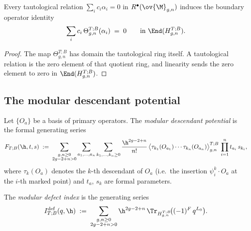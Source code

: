 \begin{proposition}
\label{prop:tautological-boundary-relations}
Every tautological relation $\sum_i c_i \alpha_i = 0$ in $R^\bullet(\ov{\M}_{g,n})$
induces the boundary operator identity
\[
\sum_i c_i\,\Theta_{g,n}^{T;B}(\alpha_i) \;=\; 0
\qquad \text{in } \End(H_{g,n}^{T;B}).
\]
\end{proposition}

\begin{proof}
The map $\Theta_{g,n}^{T;B}$ has domain the tautological ring itself. A tautological
relation is the zero element of that quotient ring, and linearity sends the zero element
to zero in $\End(H_{g,n}^{T;B})$.
\end{proof}

\subsection{The modular descendant potential}
\label{subsec:modular-descendant-potential}

\begin{definition}
\label{def:modular-descendant-potential}
Let $\{O_a\}$ be a basis of primary operators. The \emph{modular descendant potential}
is the formal generating series
\begin{equation}
\label{eq:modular-descendant-potential}
F_{T;B}(\h,t,s)
\;:=\;
\sum_{\substack{g,n \geq 0 \\ 2g-2+n > 0}}
\sum_{a_1,\dots,a_n}
\sum_{k_1,\dots,k_n \geq 0}
\frac{\h^{2g-2+n}}{n!}\,
\bigl\langle \tau_{k_1}(O_{a_1}) \cdots \tau_{k_n}(O_{a_n})
\bigr\rangle_{g,n}^{T;B}\,
\prod_{i=1}^n t_{a_i}\,s_{k_i},
\end{equation}
where $\tau_k(O_a)$ denotes the $k$-th descendant of $O_a$ (i.e.\ the insertion
$\psi_i^k \cdot O_a$ at the $i$-th marked point) and $t_a$, $s_k$ are formal parameters.
\end{definition}

\begin{definition}
\label{def:modular-defect-index}
The \emph{modular defect index} is the generating series
\begin{equation}
\label{eq:modular-defect-index}
I_{T;B}^{\mathrm{def}}(q,\h)
\;:=\;
\sum_{\substack{g,n \geq 0 \\ 2g-2+n > 0}}
\h^{2g-2+n}\,
\Tr_{H_{g,n}^{T;B}}\!\bigl((-1)^F\,q^{L_0}\bigr).
\end{equation}
\end{definition}

